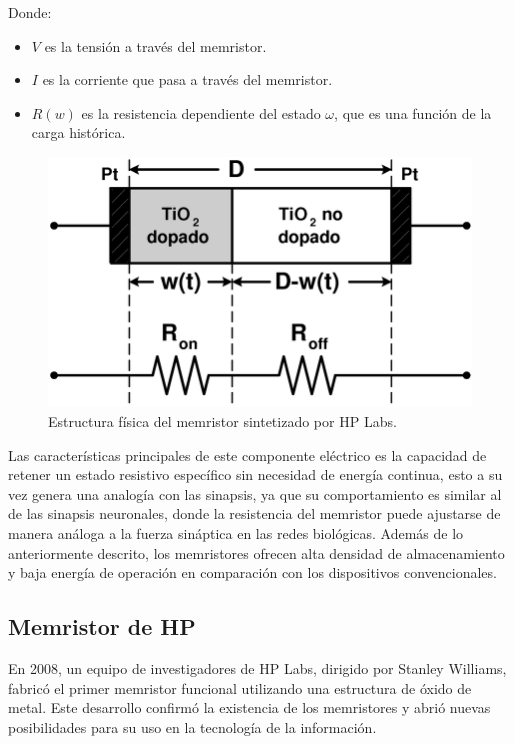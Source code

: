 \documentclass[conference]{IEEEtran}
\begin{document}
Donde:
\begin{itemize}
	\item $V$ es la tensión a través del memristor.
	\item $I$ es la corriente que pasa a través del memristor.
	\item $R(w)$ es la resistencia dependiente del estado $\omega$, que es una función de la carga histórica.
\end{itemize}

\begin{figure}[ht]
	\centering
	\includegraphics[scale=0.27]{img/MemristorHP.png}
	\caption{Estructura física del memristor sintetizado por HP Labs.
		\label{fig:memristorhp}}
\end{figure}

Las características principales de este componente eléctrico es la capacidad de retener un estado resistivo específico sin necesidad de energía continua, esto a su vez genera una analogía con las sinapsis, ya que su comportamiento es similar al de las sinapsis neuronales, donde la resistencia del memristor puede ajustarse de manera análoga a la fuerza sináptica en las redes biológicas. Además de lo anteriormente descrito, los memristores ofrecen alta densidad de almacenamiento y baja energía de operación en comparación con los dispositivos convencionales.

\subsection{Memristor de HP}
En 2008, un equipo de investigadores de HP Labs, dirigido por Stanley Williams, fabricó el primer memristor funcional utilizando una estructura de óxido de metal. \cite{HP2} Este desarrollo confirmó la existencia de los memristores y abrió nuevas posibilidades para su uso en la tecnología de la información.
\end{document}
